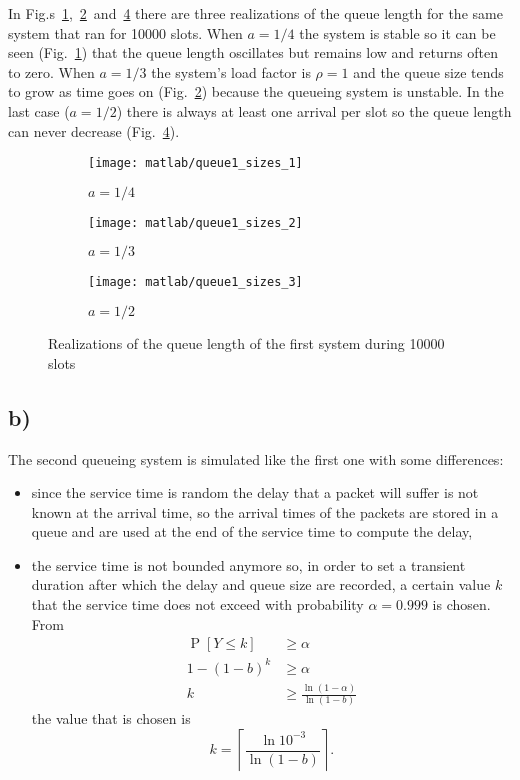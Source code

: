 \documentclass[a4paper,oneside]{article}
\newcommand{\ceil}[1]{\left\lceil#1\right\rceil}
\newcommand{\Prob}[1]{\operatorname{P}\left[#1\right]}
\begin{document}
In
Fig.s~\ref{plot:queue1_sizes_stable},~\ref{plot:queue1_sizes_limit}~and~\ref{plot:queue1_sizes_unstable}
there are three realizations of the queue length for the same system
that ran for 10000 slots. When $a = 1/4$ the system is stable so it
can be seen (Fig.~\ref{plot:queue1_sizes_stable}) that the queue
length oscillates but remains low and returns often to zero. When $a =
1/3$ the system's load factor is $\rho = 1$ and the queue size tends
to grow as time goes on (Fig.~\ref{plot:queue1_sizes_limit}) because
the queueing system is unstable. In the last case ($a = 1/2$) there is
always at least one arrival per slot so the queue length can never
decrease (Fig.~\ref{plot:queue1_sizes_unstable}).
\begin{figure}[htbp]
  \centering
  \begin{subfigure}{0.5\textwidth}
    \centering
    \texttt{[image: matlab/queue1\_sizes\_1]}
    \caption{$ a = 1/4 $}
    \label{plot:queue1_sizes_stable}
  \end{subfigure}%
  \begin{subfigure}{0.5\textwidth}
    \centering
    \texttt{[image: matlab/queue1\_sizes\_2]}
    \caption{$ a = 1/3 $}
    \label{plot:queue1_sizes_limit}
  \end{subfigure}
  \begin{subfigure}{0.5\textwidth}
    \centering
    \texttt{[image: matlab/queue1\_sizes\_3]}
    \caption{$ a = 1/2 $}
    \label{plot:queue1_sizes_unstable}
  \end{subfigure}
  \caption{Realizations of the queue length of the first system during
    10000 slots}
\end{figure}

\subsection*{b)}
The second queueing system is simulated like the first one with some
differences:
\begin{itemize}
  \item since the service time is random the delay that a packet will
    suffer is not known at the arrival time, so the arrival times of
    the packets are stored in a queue and are used at the end of the
    service time to compute the delay,
  \item the service time is not bounded anymore so, in order to set a
    transient duration after which the delay and queue size are
    recorded, a certain value $k$ that the service time does not
    exceed with probability $\alpha = 0.999$ is chosen. From
    \begin{align}
      \Prob{Y \leq k} & \geq \alpha \\
      1-(1-b)^k & \geq \alpha \\
      k & \geq \frac{\ln(1-\alpha)}{\ln(1-b)}
    \end{align}
    the value that is chosen is
    \begin{equation}
      k = \ceil{\frac{\ln10^{-3}}{\ln(1-b)}} .
    \end{equation}
\end{itemize}
\end{document}
